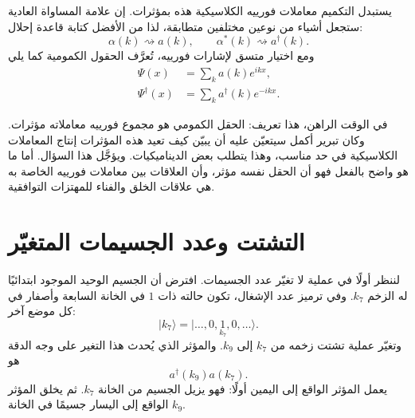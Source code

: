 يستبدل التكميم معاملات فورييه الكلاسيكية هذه بمؤثرات. إن علامة المساواة العادية ستجعل أشياء من نوعين مختلفين متطابقة، لذا من الأفضل كتابة قاعدة إحلال:
\begin{equation}
\alpha(k)\rightsquigarrow a(k),
\qquad
\alpha^*(k)\rightsquigarrow a^\dagger(k).
\end{equation}
ومع اختيار متسق لإشارات فورييه، تُعرَّف الحقول الكمومية كما يلي
\begin{align}
\Psi(x)&=\sum_k a(k)e^{ikx},\\
\Psi^\dagger(x)&=\sum_k a^\dagger(k)e^{-ikx}.
\end{align}

في الوقت الراهن، هذا تعريف: الحقل الكمومي هو مجموع فورييه معاملاته مؤثرات. وكان تبرير أكمل سيتعيّن عليه أن يبيّن كيف تعيد هذه المؤثرات إنتاج المعاملات الكلاسيكية في حد مناسب، وهذا يتطلب بعض الديناميكيات. ويؤجَّل هذا السؤال. أما ما هو واضح بالفعل فهو أن الحقل نفسه مؤثر، وأن العلاقات بين معاملات فورييه الخاصة به هي علاقات الخلق والفناء للمهتزات التوافقية.

\begin{classroomqa}
\end{classroomqa}

\section{التشتت وعدد الجسيمات المتغيّر}

لننظر أولًا في عملية لا تغيّر عدد الجسيمات. افترض أن الجسيم الوحيد الموجود ابتدائيًا له الزخم \(k_7\). وفي ترميز عدد الإشغال، تكون حالته ذات \(1\) في الخانة السابعة وأصفار في كل موضع آخر:
\begin{equation}
|k_7\rangle
=
|\ldots,0,\underset{k_7}{1},0,\ldots\rangle.
\end{equation}
وتغيّر عملية تشتت زخمه من \(k_7\) إلى \(k_9\). والمؤثر الذي يُحدث هذا التغير على وجه الدقة هو
\begin{equation}
a^\dagger(k_9)a(k_7).
\end{equation}
يعمل المؤثر الواقع إلى اليمين أولًا: فهو يزيل الجسيم من الخانة \(k_7\). ثم يخلق المؤثر الواقع إلى اليسار جسيمًا في الخانة \(k_9\).

